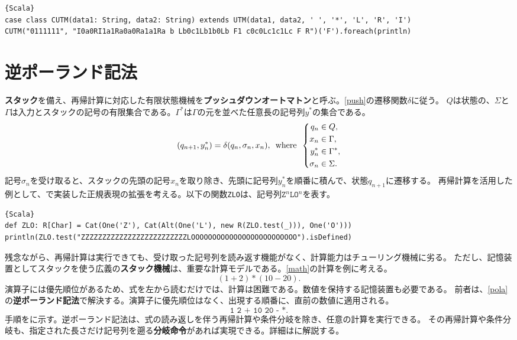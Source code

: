 \documentclass[10pt,a4paper]{book}
\begin{document}
\begin{Verbatim}{Scala}
case class CUTM(data1: String, data2: String) extends UTM(data1, data2, ' ', '*', 'L', 'R', 'I')
CUTM("0111111", "I0a0RI1a1Ra0a0Ra1a1Ra b Lb0c1Lb1b0Lb F1 c0c0Lc1c1Lc F R")('F').foreach(println)
\end{Verbatim}

\section{逆ポーランド記法\label{sect:pola}}

\textbf{スタック}を備え、再帰計算に対応した有限状態機械を\textbf{プッシュダウンオートマトン}と呼ぶ。\eqref{push}の遷移関数$\delta$に従う。
$Q$は状態の、$\Sigma$と$\Gamma$は入力とスタックの記号の有限集合である。$\Gamma^*$は$\Gamma$の元を並べた任意長の記号列$y^*$の集合である。
%
\begin{equation}
\label{eq:push}
(q_{n+1},y^*_n) = \delta(q_n,\sigma_n,x_n),
\enspace\mathrm{where}\enspace
\left\{
\begin{aligned}
q_n &\in Q,\\
x_n &\in \Gamma,\\
y^*_n &\in \Gamma^*,\\
\sigma_n &\in \Sigma.
\end{aligned}
\right.
\end{equation}
%
記号$\sigma_n$を受け取ると、スタックの先頭の記号$x_n$を取り除き、先頭に記号列$y^*_n$を順番に積んで、状態$q_{n+1}$に遷移する。
再帰計算を活用した例として、で実装した正規表現の拡張を考える。以下の関数\texttt{ZLO}は、記号列$\texttt{Z}^n\texttt{L}\texttt{O}^n$を表す。

\begin{Verbatim}{Scala}
def ZLO: R[Char] = Cat(One('Z'), Cat(Alt(One('L'), new R(ZLO.test(_))), One('O')))
println(ZLO.test("ZZZZZZZZZZZZZZZZZZZZZZZZZLOOOOOOOOOOOOOOOOOOOOOOOOO").isDefined)
\end{Verbatim}

残念ながら、再帰計算は実行できても、受け取った記号列を読み返す機能がなく、計算能力はチューリング機械に劣る。
ただし、記憶装置としてスタックを使う広義の\textbf{スタック機械}は、重要な計算モデルである。\eqref{math}の計算を例に考える。
%
\begin{equation}
\label{eq:math}
(1 + 2) * (10 - 20).
\end{equation}
%
演算子には優先順位があるため、式を左から読むだけでは、計算は困難である。数値を保持する記憶装置も必要である。
前者は、\eqref{pola}の\textbf{逆ポーランド記法}で解決する。演算子に優先順位はなく、出現する順番に、直前の数値に適用される。
%
\begin{equation}
\label{eq:pola}
\texttt{1 2 + 10 20 - *}.
\end{equation}
%
手順をに示す。逆ポーランド記法は、式の読み返しを伴う再帰計算や条件分岐を除き、任意の計算を実行できる。
その再帰計算や条件分岐も、指定された長さだけ記号列を遡る\textbf{分岐命令}があれば実現できる。詳細はに解説する。
\end{document}
